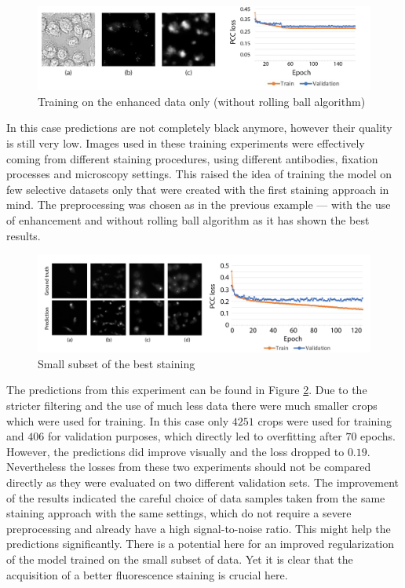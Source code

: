 \begin{figure}[htb]
	\begin{center}
		\includegraphics[width=\linewidth]{bilder/golgi/enhanced-crop.png}
		\caption{Training on the enhanced data only (without rolling ball algorithm)}\label{fig:golgi-enhanced-predictions}
	\end{center}
\end{figure}
In this case predictions are not completely black anymore, however their quality is still very low. Images used in these training experiments were effectively coming from different staining procedures, using different antibodies, fixation processes and microscopy settings. This raised the idea of training the model on few selective datasets only that were created with the first staining approach in mind. The preprocessing was chosen as in the previous example --- with the use of enhancement and without rolling ball algorithm as it has shown the best results.

\begin{figure}[htb]
	\begin{center}
		\includegraphics[width=\linewidth]{bilder/golgi/12-13/12-13.png}
		\caption{Small subset of the best staining}\label{fig:12-13}
	\end{center}
\end{figure}

The predictions from this experiment can be found in Figure \ref{fig:12-13}. Due to the stricter filtering and the use of much less data there were much smaller crops which were used for training. In this case only $4251$ crops were used for training and $406$ for validation purposes, which directly led to overfitting after $70$ epochs. However, the predictions did improve visually and the loss dropped to $0.19$. Nevertheless the losses from these two experiments should not be compared directly as they were evaluated on two different validation sets. The improvement of the results indicated the careful choice of data samples taken from the same staining approach with the same settings, which do not require a severe preprocessing and already have a high signal-to-noise ratio. This might help the predictions significantly. There is a potential here for an improved regularization of the model trained on the small subset of data. Yet it is clear that the acquisition of a better fluorescence staining is crucial here.